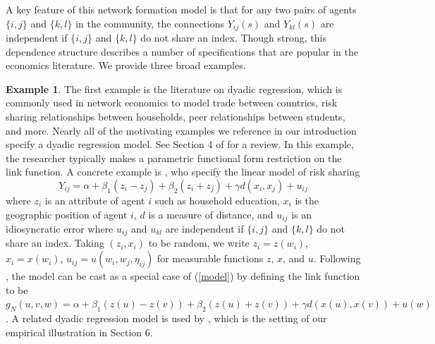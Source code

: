 \documentclass[12pt]{article}
\theoremstyle{definition}
\newtheorem{example}{Example}
\begin{document}


A key feature of this network formation model is that for any two pairs of agents $\{i,j\}$ and $\{k,l\}$ in the community, the connections $Y_{ij}(s)$ and $Y_{kl}(s)$ are independent if $\{i,j\}$ and $\{k,l\}$ do not share an index. Though strong, this dependence structure describes a number of specifications that are popular in the economics literature. We provide three broad examples.  

\begin{example}
The first example is the literature on dyadic regression, which is commonly used in network economics to model trade between countries, risk sharing relationships between households, peer relationships between students, and more. Nearly all of the motivating examples we reference in our introduction specify a dyadic regression model. See Section 4 of \cite{graham2020network} for a review. In this example, the researcher typically makes a  parametric functional form restriction on the link function. A concrete example is \cite{fafchamps2007risk}, who specify the linear model of risk sharing  
\begin{equation}\label{dyadicreg}
	Y_{ij} = \alpha + \beta_1 (z_i - z_j) + \beta_2 (z_i + z_j) + \gamma d(x_i,x_j) + u_{ij}
\end{equation}
where $z_i$ is an attribute of agent $i$ such as household education, $x_i$ is the geographic position of agent $i$, $d$ is a measure of distance, and $u_{ij}$ is an idiosyncratic error where $u_{ij}$ and $u_{kl}$ are independent if $\{i,j\}$ and $\{k,l\}$ do not share an index. Taking $(z_i,x_i)$ to be random, we write $z_i = z(w_i)$, $x_i = x(w_i)$, $u_{ij} = u(w_i,w_j,\eta_{ij})$ for measurable functions $z$, $x$, and $u$. Following \cite{graham2020network}, the model can be cast as a special case of  (\ref{model}) by defining the link function to be $g_{N}(u,v,w) = \alpha + \beta_1(z(u)-z(v)) + \beta_2 (z(u) +z(v)) + \gamma d(x(u),x(v)) + u(w)$. A related dyadic regression model is used by \cite{banerjee2021changes}, which is the setting of our empirical illustration in Section 6.   
\end{example}
\end{document}
